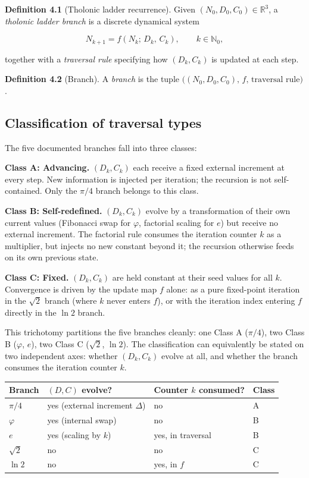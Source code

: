 \documentclass[12pt]{article}
\begin{document}
\textbf{Definition 4.1} (Tholonic ladder recurrence). Given
\((N_0, D_0, C_0) \in \mathbb{R}^3\), a \emph{tholonic ladder branch} is
a discrete dynamical system

\[N_{k+1} = f(N_k;\, D_k,\, C_k), \qquad k \in \mathbb{N}_0,\]

together with a \emph{traversal rule} specifying how \((D_k, C_k)\) is
updated at each step.

\textbf{Definition 4.2} (Branch). A \emph{branch} is the tuple
\(\bigl((N_0, D_0, C_0),\, f,\, \text{traversal rule}\bigr)\).

\subsection{Classification of traversal types}\label{classification-of-traversal-types}

The five documented branches fall into three classes:

\textbf{Class A: Advancing.} \((D_k, C_k)\) each receive a fixed
external increment at every step. New information is injected per
iteration; the recursion is not self-contained. Only the \(\pi/4\)
branch belongs to this class.

\textbf{Class B: Self-redefined.} \((D_k, C_k)\) evolve by a
transformation of their own current values (Fibonacci swap for
\(\varphi\), factorial scaling for \(e\)) but receive no external
increment. The factorial rule consumes the iteration counter \(k\) as a
multiplier, but injects no new constant beyond it; the recursion
otherwise feeds on its own previous state.

\textbf{Class C: Fixed.} \((D_k, C_k)\) are held constant at their seed
values for all \(k\). Convergence is driven by the update map \(f\)
alone: as a pure fixed-point iteration in the \(\sqrt{2}\) branch (where
\(k\) never enters \(f\)), or with the iteration index entering \(f\)
directly in the \(\ln 2\) branch.

This trichotomy partitions the five branches cleanly: one Class A
(\(\pi/4\)), two Class B (\(\varphi\), \(e\)), two Class C
(\(\sqrt{2}\), \(\ln 2\)). The classification can equivalently be stated
on two independent axes: whether \((D_k, C_k)\) evolve at all, and
whether the branch consumes the iteration counter \(k\).

\begin{longtable}[]{@{}llll@{}}
\toprule\noalign{}
Branch & \((D, C)\) evolve? & Counter \(k\) consumed? & Class \\
\midrule\noalign{}
\endhead
\bottomrule\noalign{}
\endlastfoot
\(\pi/4\) & yes (external increment \(\Delta\)) & no & A \\
\(\varphi\) & yes (internal swap) & no & B \\
\(e\) & yes (scaling by \(k\)) & yes, in traversal & B \\
\(\sqrt{2}\) & no & no & C \\
\(\ln 2\) & no & yes, in \(f\) & C \\
\end{longtable}
\end{document}
